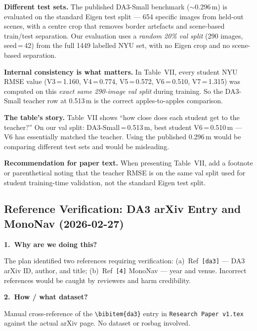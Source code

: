 \documentclass[11pt,a4paper]{article}
\begin{document}
\textbf{Different test sets.}  The published DA3-Small benchmark
($\sim$0.296\,m) is evaluated on the standard Eigen test split —
654 specific images from held-out scenes, with a centre crop that
removes border artefacts and scene-based train/test separation.
Our evaluation uses a \emph{random 20\% val split} (290 images,
seed\,=\,42) from the full 1449 labelled NYU set, with no Eigen
crop and no scene-based separation.

\textbf{Internal consistency is what matters.}  In Table~VII, every
student NYU RMSE value (V3\,=\,1.160, V4\,=\,0.774, V5\,=\,0.572,
V6\,=\,0.510, V7\,=\,1.315) was computed on this \emph{exact same
290-image val split} during training.  So the DA3-Small teacher row
at 0.513\,m is the correct apples-to-apples comparison.

\textbf{The table's story.}  Table~VII shows ``how close does each
student get to the teacher?''  On our val split:
DA3-Small\,=\,0.513\,m, best student V6\,=\,0.510\,m — V6 has
essentially matched the teacher.  Using the published 0.296\,m
would be comparing different test sets and would be misleading.

\textbf{Recommendation for paper text.}  When presenting Table~VII,
add a footnote or parenthetical noting that the teacher RMSE is on
the same val split used for student training-time validation, not
the standard Eigen test split.


\subsection*{Reference Verification: DA3 arXiv Entry and MonoNav
  (2026-02-27)}

\textbf{1.\ Why are we doing this?}

The plan identified two references requiring verification:
(a)~Ref~\texttt{[da3]} — DA3 arXiv ID, author, and title;
(b)~Ref~\texttt{[4]} MonoNav — year and venue.  Incorrect
references would be caught by reviewers and harm credibility.

\textbf{2.\ How / what dataset?}

Manual cross-reference of the \texttt{\textbackslash bibitem\{da3\}}
entry in \texttt{Research Paper v1.tex} against the actual arXiv
page.  No dataset or rosbag involved.
\end{document}
